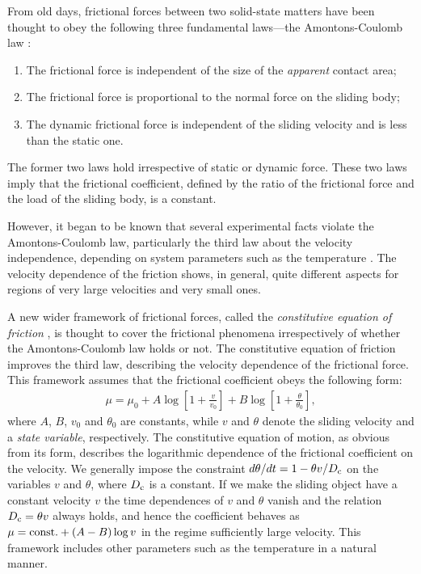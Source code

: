 From old days, frictional forces between two solid-state matters have been thought to obey the following three fundamental laws---the Amontons-Coulomb law \cite{Matsukawa2009Book}:
\begin{enumerate}
	\item The frictional force is independent of the size of the \textit{apparent} contact area;
	\item The frictional force is proportional to the normal force on the sliding body;
	\item The dynamic frictional force is independent of the sliding velocity and is less than the static one.
\end{enumerate}
The former two laws hold irrespective of static or dynamic force. These two laws imply that the frictional coefficient, defined by the ratio of the frictional force and the load of the sliding body, is a constant.

However, it began to be known that several experimental facts violate the Amontons-Coulomb law, particularly the third law about the velocity independence, depending on system parameters such as the temperature \cite{Bouhacina1997,Gnecco2000,Chen2006,Muser2011,Braun2011}. The velocity dependence of the friction shows, in general, quite different aspects for regions of very large velocities and very small ones.

A new wider framework of frictional forces, called the \textit{constitutive equation of friction} \cite{Hashiguchi2016}, is thought to cover the frictional phenomena irrespectively of whether the Amontons-Coulomb law holds or not. The constitutive equation of friction improves the third law, describing the velocity dependence of the frictional force. This framework assumes that the frictional coefficient obeys the following form:
\begin{align}
\mu = \mu_{0} + A\log \left[1+\frac{v}{v_{0}}\right] + B\log \left[1+\frac{\theta}{\theta_{0}}\right],
\end{align}
where $A$, $B$, $v_{0}$ and $\theta_{0}$ are constants, while $v$ and $\theta$ denote the sliding velocity and a \textit{state variable}, respectively. The constitutive equation of motion, as obvious from its form, describes the logarithmic dependence of the frictional coefficient on the velocity. We generally impose the constraint $d\theta/dt = 1-\theta v/D_{\rm c}$ on the variables $v$ and $\theta$, where $D_{\rm c}$ is a constant. If we make the sliding object have a constant velocity $v$ the time dependences of $v$ and $\theta$ vanish and the relation $D_{\rm c}=\theta v$ always holds, and hence the coefficient behaves as $\mu={\rm const.} +(A-B)\log v$ in the regime sufficiently large velocity. This framework includes other parameters such as the temperature in a natural manner.

